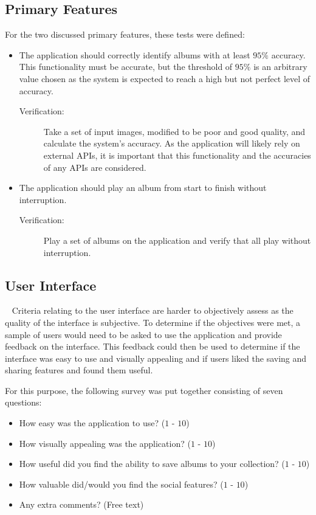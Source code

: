 \subsection{Primary Features}
For the two discussed primary features, these tests were defined:
\begin{itemize}
    \item The application should correctly identify albums with at least $95\%$ accuracy. This functionality must be accurate, but the threshold of $95\%$ is an arbitrary value chosen as the system is expected to reach a high but not perfect level of accuracy.
    \begin{description}
        \item[Verification:] Take a set of input images, modified to be poor and good quality, and calculate the system's accuracy. As the application will likely rely on external APIs, it is important that this functionality and the accuracies of any APIs are considered.
    \end{description}
    \item The application should play an album from start to finish without interruption.
    \begin{description}
        \item[Verification:] Play a set of albums on the application and verify that all play without interruption.
    \end{description}
\end{itemize}

\subsection{User Interface}~\label{sec:ui-tests}
Criteria relating to the user interface are harder to objectively assess as the quality of the interface is subjective. To determine if the objectives were met, a sample of users would need to be asked to use the application and provide feedback on the interface. This feedback could then be used to determine if the interface was easy to use and visually appealing and if users liked the saving and sharing features and found them useful.

For this purpose, the following survey was put together consisting of seven questions:
\begin{itemize}
    \item How easy was the application to use? ($1$ - $10$)
    \item How visually appealing was the application? ($1$ - $10$)
    \item How useful did you find the ability to save albums to your collection? ($1$ - $10$)
    \item How valuable did/would you find the social features? ($1$ - $10$)
    \item Any extra comments? (Free text)
\end{itemize}

